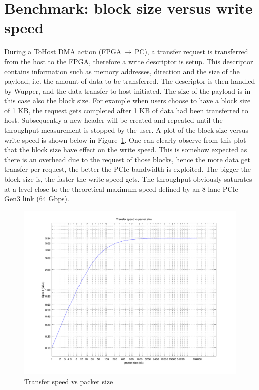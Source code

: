 \section{Benchmark: block size versus write speed}
\label{sec:blocksize}
During a ToHost DMA action (FPGA$\,\to\,$PC), a transfer request is transferred from the host to the FPGA, therefore a write descriptor is setup. This descriptor contains information such as memory addresses, direction and the size of the payload, i.e. the amount of data to be transferred. The descriptor is then handled by Wupper, and the data transfer to host initiated. The size of the payload is in this case also the block size. For example when users choose to have a block size of 1 KB, the request gets completed after 1 KB of data had been transferred to host. Subsequently a new header will be created and repeated until the throughput measurement is stopped by the user. 
A plot of the block size versus write speed is shown below in Figure~\ref{fig:blocksizeplot}. One can clearly observe from this plot that the block size have effect on the write speed. This is somehow expected as there is an overhead due to the request of those blocks, hence the more data get transfer per request, the better the PCIe bandwidth is exploited. The bigger the block size is, the faster the write speed gets. The throughput obviously saturates at a level close to the theoretical maximum speed defined by an 8 lane PCIe Gen3 link (64 Gbps).

\begin{figure}[h]
	
	\centering
	\includegraphics[width = 1 \textwidth]{figures/blocksize_plot.pdf}	
	\caption{Transfer speed vs packet size}
	\label{fig:blocksizeplot}
\end{figure}